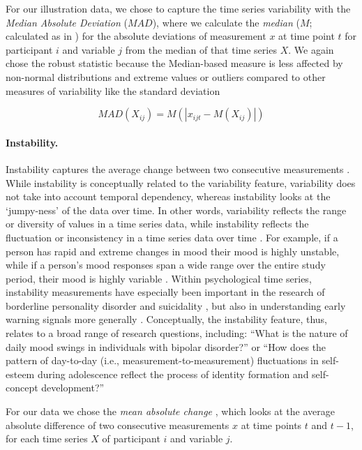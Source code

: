 For our illustration data, we chose to capture the time series
variability with the \textit{Median Absolute Deviation} (\(MAD\)), where
we calculate the \textit{median} (\(M\); calculated as in
) for the absolute deviations of measurement \(x\)
at time point \(t\) for participant \(i\) and variable \(j\) from the
median of that time series \(X\). We again chose the robust statistic
because the Median-based measure is less affected by non-normal
distributions and extreme values or outliers compared to other measures
of variability like the standard deviation \citep{weisberg1992}

\begin{equation} \label{eq:mad}
  MAD(X_{ij}) = M(\left| x_{ijt} - M(X_{ij}) \right|)
\end{equation}

\paragraph{Instability.}

Instability captures the average change between two consecutive
measurements \citep{ebner-priemer2009}. While instability is
conceptually related to the variability feature, variability does not
take into account temporal dependency, whereas instability looks at the
`jumpy-ness' of the data over time. In other words, variability reflects
the range or diversity of values in a time series data, while
instability reflects the fluctuation or inconsistency in a time series
data over time \citep{trull2008}. For example, if a person has rapid and
extreme changes in mood their mood is highly unstable, while if a
person's mood responses span a wide range over the entire study period,
their mood is highly variable \citep{jahng2008}. Within psychological
time series, instability measurements have especially been important in
the research of borderline personality disorder \citep{trull2008} and
suicidality \citep{kivela2022}, but also in understanding early warning
signals more generally \citep{wichers2019}. Conceptually, the
instability feature, thus, relates to a broad range of research
questions, including: ``What is the nature of daily mood swings in
individuals with bipolar disorder?'' or ``How does the pattern of
day-to-day (i.e., measurement-to-measurement) fluctuations in
self-esteem during adolescence reflect the process of identity formation
and self-concept development?''

For our data we chose the \textit{mean absolute change}
\citep[$MAC$; e.g.,][]{ebner-priemer2009, barandas2020}, which looks at
the average absolute difference of two consecutive measurements \(x\) at
time points \(t\) and \(t-1\), for each time series \(X\) of participant
\(i\) and variable \(j\).

